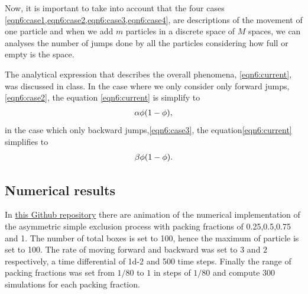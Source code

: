 \documentclass[main.tex]{subfiles}
\begin{document}
Now, it is important to take into account that the four cases \cref{eqn6:case1,eqn6:case2,eqn6:case3,eqn6:case4}, are descriptions of the movement of one particle and when we add $m$ particles in a discrete space of $M$ spaces, we can analyses the number of jumps done by all the particles  considering how full or empty is the space.

The analytical expression that describes the overall phenomena, \cref{eqn6:current}, was discussed in class.
In the case where we only consider only forward jumps,\cref{eqn6:case2}, the equation \eqref{eqn6:current} is simplify to 
\begin{gather}\alpha\phi\qty(1-\phi)\label{eqn6:jcase2},\end{gather} 
in the case which only backward jumps,\cref{eqn6:case3}, the equation\eqref{eqn6:current} simplifies to
\begin{gather}\beta\phi\qty(1-\phi)\label{eqn6:jcase3}.\end{gather}

\subsection{Numerical results}

In \href{https://github.com/FranVT/NanoTech-Masters/tree/main/1_SisCom/data/data_hk6_4}{this Github repository} there are animation of the numerical implementation of the asymmetric simple exclusion process with packing fractions of \num{0.25},\num{0.5},\num{0.75} and \num{1}.
The number of total boxes is set to 100, hence the maximum of particle is set to 100.
The rate of moving forward and backward was set to $3$ and $2$ respectively, a time differential of \num{1d-2} and \num{500} time steps.
Finally the range of packing fractions was set from $1/80$ to $1$ in steps of $1/80$ and compute 300 simulations for each packing fraction.
\end{document}
